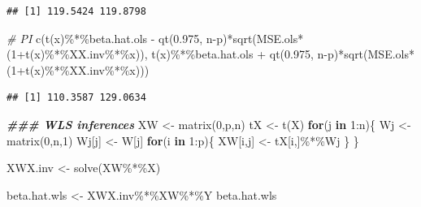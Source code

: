 \documentclass[
]{book}
\newenvironment{Shaded}{\begin{snugshade}}{\end{snugshade}}
\newcommand{\CommentTok}[1]{\textcolor[rgb]{0.56,0.35,0.01}{\textit{#1}}}
\newcommand{\ControlFlowTok}[1]{\textcolor[rgb]{0.13,0.29,0.53}{\textbf{#1}}}
\newcommand{\DecValTok}[1]{\textcolor[rgb]{0.00,0.00,0.81}{#1}}
\newcommand{\DocumentationTok}[1]{\textcolor[rgb]{0.56,0.35,0.01}{\textbf{\textit{#1}}}}
\newcommand{\FloatTok}[1]{\textcolor[rgb]{0.00,0.00,0.81}{#1}}
\newcommand{\FunctionTok}[1]{\textcolor[rgb]{0.00,0.00,0.00}{#1}}
\newcommand{\NormalTok}[1]{#1}
\newcommand{\OtherTok}[1]{\textcolor[rgb]{0.56,0.35,0.01}{#1}}
\newcommand{\SpecialCharTok}[1]{\textcolor[rgb]{0.00,0.00,0.00}{#1}}
\begin{document}
\begin{verbatim}
## [1] 119.5424 119.8798
\end{verbatim}

\begin{Shaded}
\begin{Highlighting}[]
\CommentTok{\# PI}
\FunctionTok{c}\NormalTok{(}\FunctionTok{t}\NormalTok{(x)}\SpecialCharTok{\%*\%}\NormalTok{beta.hat.ols }\SpecialCharTok{{-}} \FunctionTok{qt}\NormalTok{(}\FloatTok{0.975}\NormalTok{, n}\SpecialCharTok{{-}}\NormalTok{p)}\SpecialCharTok{*}\FunctionTok{sqrt}\NormalTok{(MSE.ols}\SpecialCharTok{*}\NormalTok{(}\DecValTok{1}\SpecialCharTok{+}\FunctionTok{t}\NormalTok{(x)}\SpecialCharTok{\%*\%}\NormalTok{XX.inv}\SpecialCharTok{\%*\%}\NormalTok{x)), }\FunctionTok{t}\NormalTok{(x)}\SpecialCharTok{\%*\%}\NormalTok{beta.hat.ols }\SpecialCharTok{+} \FunctionTok{qt}\NormalTok{(}\FloatTok{0.975}\NormalTok{, n}\SpecialCharTok{{-}}\NormalTok{p)}\SpecialCharTok{*}\FunctionTok{sqrt}\NormalTok{(MSE.ols}\SpecialCharTok{*}\NormalTok{(}\DecValTok{1}\SpecialCharTok{+}\FunctionTok{t}\NormalTok{(x)}\SpecialCharTok{\%*\%}\NormalTok{XX.inv}\SpecialCharTok{\%*\%}\NormalTok{x)))}
\end{Highlighting}
\end{Shaded}

\begin{verbatim}
## [1] 110.3587 129.0634
\end{verbatim}

\begin{Shaded}
\begin{Highlighting}[]
\DocumentationTok{\#\#\# WLS inferences}
\NormalTok{XW }\OtherTok{\textless{}{-}} \FunctionTok{matrix}\NormalTok{(}\DecValTok{0}\NormalTok{,p,n)}
\NormalTok{tX }\OtherTok{\textless{}{-}} \FunctionTok{t}\NormalTok{(X)}
\ControlFlowTok{for}\NormalTok{(j }\ControlFlowTok{in} \DecValTok{1}\SpecialCharTok{:}\NormalTok{n)\{}
\NormalTok{  Wj }\OtherTok{\textless{}{-}} \FunctionTok{matrix}\NormalTok{(}\DecValTok{0}\NormalTok{,n,}\DecValTok{1}\NormalTok{)}
\NormalTok{  Wj[j] }\OtherTok{\textless{}{-}}\NormalTok{ W[j]}
\ControlFlowTok{for}\NormalTok{(i }\ControlFlowTok{in} \DecValTok{1}\SpecialCharTok{:}\NormalTok{p)\{}
\NormalTok{  XW[i,j] }\OtherTok{\textless{}{-}}\NormalTok{ tX[i,]}\SpecialCharTok{\%*\%}\NormalTok{Wj}
\NormalTok{\}}
\NormalTok{\}  }

\NormalTok{XWX.inv }\OtherTok{\textless{}{-}} \FunctionTok{solve}\NormalTok{(XW}\SpecialCharTok{\%*\%}\NormalTok{X)}



\NormalTok{beta.hat.wls }\OtherTok{\textless{}{-}}\NormalTok{ XWX.inv}\SpecialCharTok{\%*\%}\NormalTok{XW}\SpecialCharTok{\%*\%}\NormalTok{Y}
\NormalTok{beta.hat.wls}
\end{Highlighting}
\end{Shaded}
\end{document}
